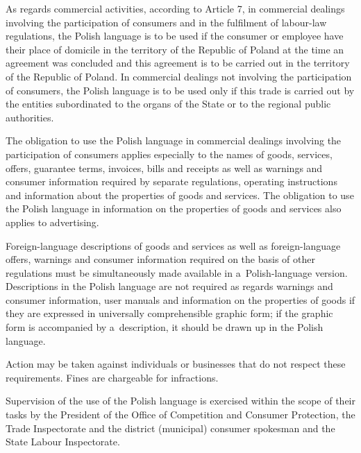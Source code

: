 \begin{multicols}{2}
As regards commercial activities, according to Article 7, in
commercial dealings involving the participation of consumers and in
the fulfilment of labour-law regulations, the Polish language is to be
used if the consumer or employee have their place of domicile in the
territory of the Republic of Poland at the time an agreement was
concluded and this agreement is to be carried out in the territory of
the Republic of Poland. In commercial dealings not involving the
participation of consumers, the Polish language is to be used only if
this trade is carried out by the entities subordinated to the organs
of the State or to the regional public authorities. 

The obligation to use the Polish language in commercial dealings
involving the participation of consumers applies especially to the
names of goods, services, offers, guarantee terms, invoices, bills and
receipts as well as warnings and consumer information required by
separate regulations, operating instructions and information about the
properties of goods and services. The obligation to use the Polish
language in information on the properties of goods and services also
applies to advertising. 


Foreign-language descriptions of goods and services as well as
foreign-language offers, warnings and consumer information required on
the basis of other regulations must be simultaneously made available
in a~Polish-language version. Descriptions in the Polish language are
not required as regards warnings and consumer information, user
manuals and information on the properties of goods if they are
expressed in universally comprehensible graphic form; if the graphic
form is accompanied by a~description, it should be drawn up in the
Polish language. 

Action may be taken against individuals or businesses that do not
respect these requirements. Fines are chargeable for infractions. 

Supervision of the use of the Polish language is exercised within the
scope of their tasks by the President of the Office of Competition and
Consumer Protection, the Trade Inspectorate and the district
(municipal) consumer spokesman and the State Labour Inspectorate. 


\end{multicols}
